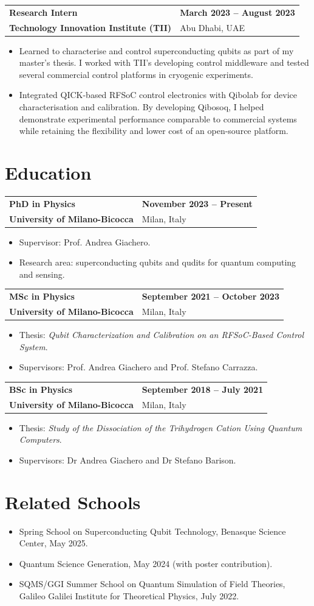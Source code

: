 \documentclass[10pt,a4paper]{article}
\makeatletter
\newcommand{\cvsection}[1]{%
  \Needspace{7\baselineskip}%
  \section{#1}%
}
\newcommand{\cventry}[4]{%
  \Needspace{4\baselineskip}%
  \par\addvspace{0.45em}%
  \begin{tabularx}{\textwidth}{@{}X>{\raggedleft\arraybackslash}p{5.45cm}@{}}
    {\large\bfseries\color{DarkGrey}#1} & {\small\bfseries\color{AccentMuted}#3} \\
    {\bfseries\color{Accent}#2} & {\small\color{BodyGrey}#4}
  \end{tabularx}%
  \vspace{-0.2em}
}
\makeatother
\begin{document}
\cventry{Research Intern}{Technology Innovation Institute (TII)}{March 2023 -- August 2023}{Abu Dhabi, UAE}
\begin{itemize}
  \item Learned to characterise and control superconducting qubits as part of my master's thesis. I worked with TII's developing control middleware and tested several commercial control platforms in cryogenic experiments.
  \item Integrated QICK-based RFSoC control electronics with Qibolab for device characterisation and calibration. By developing Qibosoq, I helped demonstrate experimental performance comparable to commercial systems while retaining the flexibility and lower cost of an open-source platform.
\end{itemize}

\cvsection{Education}

\cventry{PhD in Physics}{University of Milano-Bicocca}{November 2023 -- Present}{Milan, Italy}
\begin{itemize}
  \item Supervisor: Prof. Andrea Giachero.
  \item Research area: superconducting qubits and qudits for quantum computing and sensing.
\end{itemize}

\cventry{MSc in Physics}{University of Milano-Bicocca}{September 2021 -- October 2023}{Milan, Italy}
\begin{itemize}
  \item Thesis: \emph{Qubit Characterization and Calibration on an RFSoC-Based Control System}.
  \item Supervisors: Prof. Andrea Giachero and Prof. Stefano Carrazza.
\end{itemize}

\cventry{BSc in Physics}{University of Milano-Bicocca}{September 2018 -- July 2021}{Milan, Italy}
\begin{itemize}
  \item Thesis: \emph{Study of the Dissociation of the Trihydrogen Cation Using Quantum Computers}.
  \item Supervisors: Dr Andrea Giachero and Dr Stefano Barison.
\end{itemize}

\cvsection{Related Schools}

\begin{itemize}
  \item Spring School on Superconducting Qubit Technology, Benasque Science Center, May 2025.
  \item Quantum Science Generation, May 2024 (with poster contribution).
  \item SQMS/GGI Summer School on Quantum Simulation of Field Theories, Galileo Galilei Institute for Theoretical Physics, July 2022.
\end{itemize}
\end{document}
